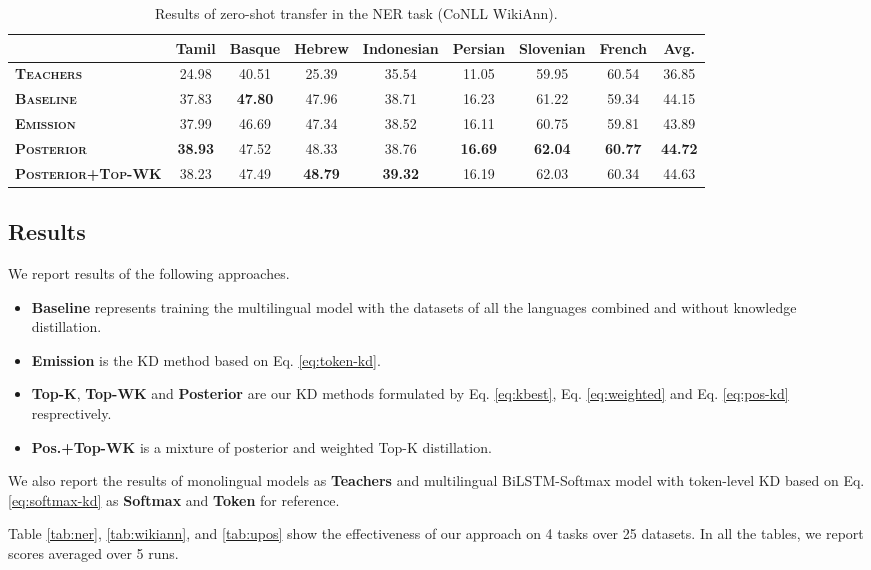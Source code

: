 \documentclass[11pt,a4paper]{article}
\begin{document}
\begin{table*}[ht]
\centering
\small
\begin{tabular}{l|ccccccc|c}
\hline\hline
 & \bf Tamil & \bf Basque    & \bf Hebrew    & \bf Indonesian & \bf Persian   & \bf Slovenian    & \bf French      & \bf Avg.   \\
\hline
\bf \textsc{Teachers}&          24.98&  40.51&  25.39&  35.54&  11.05&  59.95&  60.54&  36.85  \\
\bf \textsc{Baseline}         & 37.83 & \textbf{47.80} & 47.96 & 38.71 & 16.23 & 61.22 & 59.34 & 44.15 \\
\bf \textsc{Emission}        & 37.99 & 46.69 & 47.34 & 38.52 & 16.11 & 60.75 & 59.81 & 43.89 \\
\bf \textsc{Posterior}        & \textbf{38.93} & 47.52 & 48.33 & 38.76 & \textbf{16.69} & \textbf{62.04} & \textbf{60.77} & \textbf{44.72} \\
\bf \textsc{Posterior+Top-WK} & 38.23 & 47.49 & \textbf{48.79} & \textbf{39.32} & 16.19 & 62.03 & 60.34 & 44.63 \\
\hline\hline
\end{tabular}
\caption{Results of zero-shot transfer in the NER task (CoNLL  WikiAnn).}
\label{tab:zeroshot}
\end{table*}

\subsection{Results}
\label{sec:result}
We report results of the following approaches.
\begin{itemize}
\item {\bf Baseline} represents training the multilingual model with the datasets of all the languages combined and without knowledge distillation.
    \item {\bf Emission} is the KD method based on Eq. \ref{eq:token-kd}.
    \item {\bf Top-K}, {\bf Top-WK} and {\bf Posterior} are our KD methods formulated by Eq. \ref{eq:kbest}, Eq. \ref{eq:weighted} and Eq. \ref{eq:pos-kd} resprectively. \item {\bf Pos.+Top-WK} is a mixture of posterior and weighted Top-K distillation.
\end{itemize}
We also report the results of monolingual models as {\bf Teachers} and multilingual BiLSTM-Softmax model with token-level KD based on Eq. \ref{eq:softmax-kd} as {\bf Softmax} and {\bf Token} for reference.


Table \ref{tab:ner}, \ref{tab:wikiann}, and \ref{tab:upos} show the effectiveness of our approach on 4 tasks over 25 datasets. In all the tables, we report scores averaged over 5 runs. 
\end{document}
